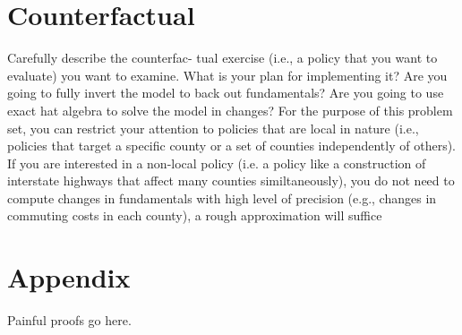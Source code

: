 \documentclass{article}
\begin{document}
\section{Counterfactual}
\label{sec:counterfactual}
Carefully describe the counterfac-
tual exercise (i.e., a policy that you want to evaluate) you want to examine. What is your plan for implementing it? Are you going to fully invert the model to back out
fundamentals? Are you going to use exact hat algebra to solve the model in changes?
For the purpose of this problem set, you can restrict your attention to policies that
are local in nature (i.e., policies that target a specific county or a set of counties
independently of others). If you are interested in a non-local policy (i.e. a policy like a
construction of interstate highways that affect many counties similtaneously), you do
not need to compute changes in fundamentals with high level of precision (e.g., changes
in commuting costs in each county), a rough approximation will suffice

\section{Appendix}
Painful proofs go here.
\end{document}
